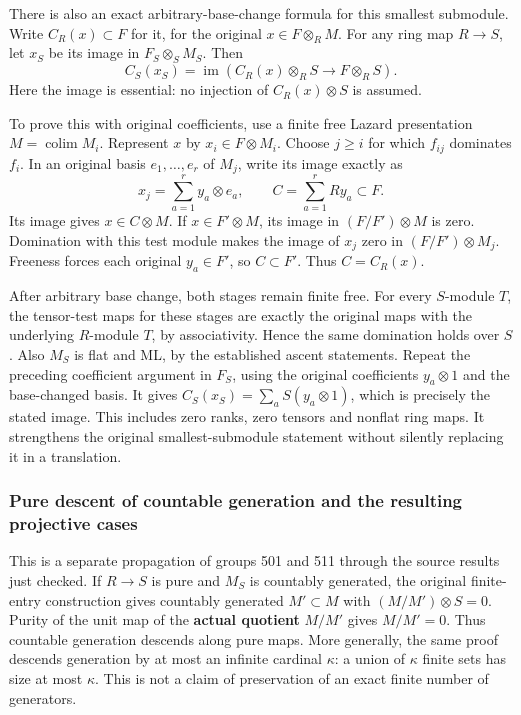 There is also an exact arbitrary-base-change formula for this smallest submodule. Write \(C_R(x)\subset F\) for it, for the original \(x\in F\otimes_RM\). For any ring map \(R\to S\), let \(x_S\) be its image in \(F_S\otimes_S M_S\). Then \[
C_S(x_S)=\operatorname{im}(C_R(x)\otimes_RS\longrightarrow F\otimes_RS).
\] Here the image is essential: no injection of \(C_R(x)\otimes S\) is assumed.

To prove this with original coefficients, use a finite free Lazard presentation \(M=\operatorname{colim}M_i\). Represent \(x\) by \(x_i\in F\otimes M_i\). Choose \(j\geq i\) for which \(f_{ij}\) dominates \(f_i\). In an original basis \(e_1,\ldots,e_r\) of \(M_j\), write its image exactly as \[
x_j=\sum_{a=1}^r y_a\otimes e_a,
\qquad C=\sum_{a=1}^r Ry_a\subset F.
\] Its image gives \(x\in C\otimes M\). If \(x\in F'\otimes M\), its image in \((F/F')\otimes M\) is zero. Domination with this test module makes the image of \(x_j\) zero in \((F/F')\otimes M_j\). Freeness forces each original \(y_a\in F'\), so \(C\subset F'\). Thus \(C=C_R(x)\).

After arbitrary base change, both stages remain finite free. For every \(S\)-module \(T\), the tensor-test maps for these stages are exactly the original maps with the underlying \(R\)-module \(T\), by associativity. Hence the same domination holds over \(S\). Also \(M_S\) is flat and ML, by the established ascent statements. Repeat the preceding coefficient argument in \(F_S\), using the original coefficients \(y_a\otimes1\) and the base-changed basis. It gives \(C_S(x_S)=\sum_a S(y_a\otimes1)\), which is precisely the stated image. This includes zero ranks, zero tensors and nonflat ring maps. It strengthens the original smallest-submodule statement without silently replacing it in a translation.

\subsubsection{Pure descent of countable generation and the resulting projective cases}\label{algebra-proof-013-pure-descent-of-countable-generation-and-the-resulting-projective-cases}

This is a separate propagation of groups 501 and 511 through the source results just checked. If \(R\to S\) is pure and \(M_S\) is countably generated, the original finite-entry construction gives countably generated \(M'\subset M\) with \((M/M')\otimes S=0\). Purity of the unit map of the \textbf{actual quotient} \(M/M'\) gives \(M/M'=0\). Thus countable generation descends along pure maps. More generally, the same proof descends generation by at most an infinite cardinal \(\kappa\): a union of \(\kappa\) finite sets has size at most \(\kappa\). This is not a claim of preservation of an exact finite number of generators.

